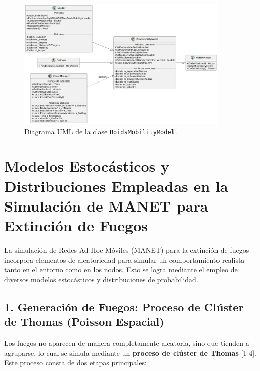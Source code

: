 \documentclass{article}
\begin{document}
\begin{figure}[H]
    \centering
    \includegraphics[width=0.9\textwidth]{class_diagram.png}
    \caption{Diagrama UML de la clase \texttt{BoidsMobilityModel}.}
    \label{fig:uml-boids}
\end{figure}

\section{Modelos Estocásticos y Distribuciones Empleadas en la Simulación de MANET para Extinción de Fuegos}

La simulación de Redes Ad Hoc Móviles (MANET) para la extinción de fuegos incorpora elementos de aleatoriedad para simular un comportamiento realista tanto en el entorno como en los nodos. Esto se logra mediante el empleo de diversos modelos estocásticos y distribuciones de probabilidad.

\subsection*{1. Generación de Fuegos: Proceso de Clúster de Thomas (Poisson Espacial)}
Los fuegos no aparecen de manera completamente aleatoria, sino que tienden a agruparse, lo cual se simula mediante un \textbf{proceso de clúster de Thomas} [1-4]. Este proceso consta de dos etapas principales:
\end{document}

